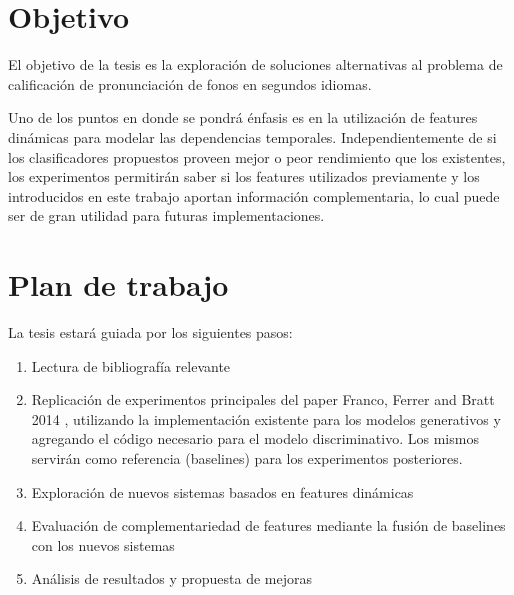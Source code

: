 \documentclass[a4paper,12pt]{article} %
\begin{document}

\section{Objetivo}

El objetivo de la tesis es la exploración de soluciones alternativas al problema de calificación
de pronunciación de fonos en segundos idiomas.

Uno de los puntos en donde se pondrá énfasis es en la utilización de features dinámicas para 
modelar las dependencias temporales.
Independientemente de si los clasificadores propuestos proveen mejor o peor rendimiento
que los existentes, los experimentos permitirán saber si los features utilizados 
previamente y los introducidos en este trabajo aportan información complementaria, 
lo cual puede ser de gran utilidad para futuras implementaciones.
	

\section{Plan de trabajo}

La tesis estará guiada por los siguientes pasos:
\begin{enumerate}
	\item Lectura de bibliografía relevante
	\item Replicación de experimentos principales del paper Franco, Ferrer and Bratt 2014 
	\cite{franco_ferrer_main_paper}, utilizando la implementación existente para los modelos
	generativos y agregando el código necesario para el modelo discriminativo. Los mismos servirán como referencia (baselines) para los experimentos posteriores.
	\item Exploraci\'on de nuevos sistemas basados en features din\'amicas
	\item Evaluaci\'on de complementariedad de features mediante la fusi\'on de baselines con los nuevos sistemas
	\item An\'alisis de resultados y propuesta de mejoras
\end{enumerate}

\newpage
\printbibliography
\end{document}
